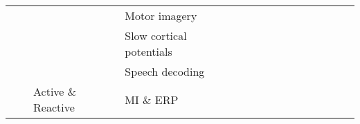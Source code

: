 \begin{tabular}{p{1.5cm}p{1.5cm}p{1.5cm}p{1.5cm}p{0.6cm}p{0.6cm}p{0.6cm}p{0.6cm}p{0.6cm}p{0.6cm}p{0.6cm}p{0.6cm}p{0.6cm}p{0.6cm}p{0.6cm}}
                                &                 &                   & Motor imagery &                                   \cite{Zhang2017a, Li2014} &  \cite{Gao2018, Sakhavi2017, Tang2017, Schirrmeister2017, Dharamsi2017, Loshchilov2017, Tabar2016a, Sakhavi2015, Yang2015a} &                                                      \cite{Zhang2018c} &                  &                        \cite{An2014} &  \cite{Chiarelli2018, Major2017, Alomari2013, Mohamed2011} &                      &                       &  \cite{Zhang2017g, Normand2015} &                         &                                            \cite{Zhang2017d, Bu2010} \\
                                &                 &                   & Slow cortical potentials &                                                             &                                                                                                                             &                                                                        &                  &                                      &                                                            &                      &                       &                 \cite{Ding2015} &                         &                                                                      \\
                                &                 &                   & Speech decoding &                                                             &                                                                                                                             &                                                                        &                  &                      \cite{Sree2017} &                                                            &                      &                       &                                 &          \cite{Sun2016} &                                                                      \\
                                &                 & Active \& Reactive & MI \& ERP &                                                             &                                                                                                          \cite{Lawhern2018} &                                                                        &                  &                                      &                                                            &                      &                       &                                 &                         &                                                                      \\

\end{tabular}
